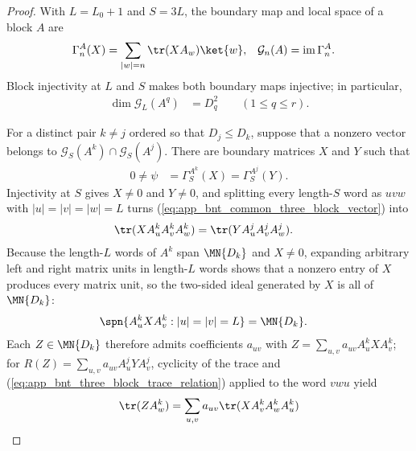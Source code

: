 \begin{proof}
    \leanok
    With $L=L_0+1$ and $S=3L$, the boundary map and local space of a block $A$
    are
    \begin{align}
        \Gamma_n^A(X)
         & =\sum_{|w|=n}\tr(XA_w)\ket{w},
         &
        \mathcal G_n(A)
         & =\operatorname{im}\Gamma_n^A.
        \notag
    \end{align}
    Block injectivity at $L$ and $S$ makes both boundary maps injective; in
    particular,
    \begin{align}
        \dim\mathcal G_L(A^q) & =D_q^2
        \qquad (1\leq q\leq r).
        \label{eq:app_bnt_local_space_dimension}
    \end{align}

    For a distinct pair $k\ne j$ ordered so that $D_j\leq D_k$, suppose that
    a nonzero vector belongs to
    $\mathcal G_S(A^k)\cap\mathcal G_S(A^j)$. There are boundary matrices
    $X$ and $Y$ such that
    \begin{align}
        0\ne\psi
         & =\Gamma_S^{A^k}(X)=\Gamma_S^{A^j}(Y).
        \label{eq:app_bnt_common_three_block_vector}
    \end{align}
    Injectivity at $S$ gives $X\ne0$ and $Y\ne0$, and splitting every length-$S$
    word as $uvw$ with $|u|=|v|=|w|=L$ turns
    (\ref{eq:app_bnt_common_three_block_vector}) into
    \begin{align}
        \tr(XA^k_uA^k_vA^k_w)
         & =\tr(YA^j_uA^j_vA^j_w).
        \label{eq:app_bnt_three_block_trace_relation}
    \end{align}
    Because the length-$L$ words of $A^k$ span $\MN{D_k}$ and $X\ne0$,
    expanding arbitrary left and right matrix units in length-$L$ words shows
    that a nonzero entry of $X$ produces every matrix unit, so the two-sided
    ideal generated by $X$ is all of $\MN{D_k}$:
    \begin{align}
        \spn\{A^k_uXA^k_v:|u|=|v|=L\}
         & =\MN{D_k}.
        \label{eq:app_bnt_two_sided_span}
    \end{align}
    Each $Z\in\MN{D_k}$ therefore admits coefficients $a_{uv}$ with
    $Z=\sum_{u,v}a_{uv}A^k_uXA^k_v$; for $R(Z)=\sum_{u,v}a_{uv}A^j_uYA^j_v$,
    cyclicity of the trace and (\ref{eq:app_bnt_three_block_trace_relation})
    applied to the word $vwu$ yield
    \begin{align}
        \tr(ZA^k_w)
         & =\sum_{u,v}a_{uv}\tr(XA^k_vA^k_wA^k_u)
        \notag                                    \\

\end{align}
\end{proof}
